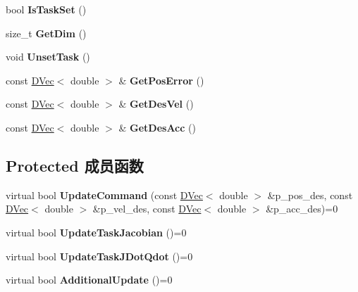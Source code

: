 \begin{DoxyCompactItemize}
\item 
\mbox{\label{classquadruped_1_1Task_a6a3beb33871582c7ca9e9df169e0bd7d}} 
bool {\bfseries Is\+Task\+Set} ()
\item 
\mbox{\label{classquadruped_1_1Task_a1cb8eace23a5221ad65c9d89cb7d679e}} 
size\+\_\+t {\bfseries Get\+Dim} ()
\item 
\mbox{\label{classquadruped_1_1Task_a76f4fc058fcc5300d1cb894656ffb180}} 
void {\bfseries Unset\+Task} ()
\item 
\mbox{\label{classquadruped_1_1Task_a8728dd3f97ef1119690bf1497d7210ad}} 
const \hyperlink{cppTypes_8h_adad69baca3c77d5f991be5d3c063fea7}{D\+Vec}$<$ double $>$ \& {\bfseries Get\+Pos\+Error} ()
\item 
\mbox{\label{classquadruped_1_1Task_a3ea78c46b815e0761f39aae7863c4ec0}} 
const \hyperlink{cppTypes_8h_adad69baca3c77d5f991be5d3c063fea7}{D\+Vec}$<$ double $>$ \& {\bfseries Get\+Des\+Vel} ()
\item 
\mbox{\label{classquadruped_1_1Task_a7ec90dfce229f16c453f2b7d5c930a41}} 
const \hyperlink{cppTypes_8h_adad69baca3c77d5f991be5d3c063fea7}{D\+Vec}$<$ double $>$ \& {\bfseries Get\+Des\+Acc} ()
\end{DoxyCompactItemize}
\subsection*{Protected 成员函数}
\begin{DoxyCompactItemize}
\item 
\mbox{\label{classquadruped_1_1Task_ae35ff689655939445b43f819539b028d}} 
virtual bool {\bfseries Update\+Command} (const \hyperlink{cppTypes_8h_adad69baca3c77d5f991be5d3c063fea7}{D\+Vec}$<$ double $>$ \&p\+\_\+pos\+\_\+des, const \hyperlink{cppTypes_8h_adad69baca3c77d5f991be5d3c063fea7}{D\+Vec}$<$ double $>$ \&p\+\_\+vel\+\_\+des, const \hyperlink{cppTypes_8h_adad69baca3c77d5f991be5d3c063fea7}{D\+Vec}$<$ double $>$ \&p\+\_\+acc\+\_\+des)=0
\item 
\mbox{\label{classquadruped_1_1Task_adcb39e5aa2daffbb72baabad7a414ae2}} 
virtual bool {\bfseries Update\+Task\+Jacobian} ()=0
\item 
\mbox{\label{classquadruped_1_1Task_ae818a2d7e013929563a859144cf050bb}} 
virtual bool {\bfseries Update\+Task\+J\+Dot\+Qdot} ()=0
\item 
\mbox{\label{classquadruped_1_1Task_aa6e18f427f6a31fb9a5d9267cc707550}} 
virtual bool {\bfseries Additional\+Update} ()=0
\end{DoxyCompactItemize}
